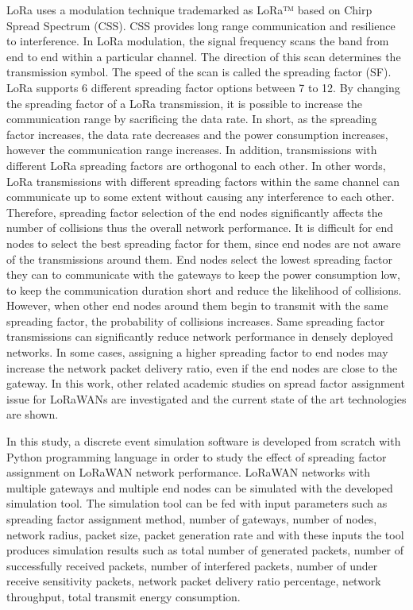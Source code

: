 LoRa uses a modulation technique trademarked as LoRa™ based on Chirp Spread Spectrum (CSS). CSS provides long range communication and resilience to interference. In LoRa modulation, the signal frequency scans the band from end to end within a particular channel. The direction of this scan determines the transmission symbol. The speed of the scan is called the spreading factor (SF). LoRa supports 6 different spreading factor options between 7 to 12. By changing the spreading factor of a LoRa transmission, it is possible to increase the communication range by sacrificing the data rate. In short, as the spreading factor increases, the data rate decreases and the power consumption increases, however the communication range increases. In addition, transmissions with different LoRa spreading factors are orthogonal to each other. In other words, LoRa transmissions with different spreading factors within the same channel can communicate up to some extent without causing any interference to each other. Therefore, spreading factor selection of the end nodes significantly affects the number of collisions thus the overall network performance. It is difficult for end nodes to select the best spreading factor for them, since end nodes are not aware of the transmissions around them. End nodes select the lowest spreading factor they can to communicate with the gateways to keep the power consumption low, to keep the communication duration short and reduce the likelihood of collisions. However, when other end nodes around them begin to transmit with the same spreading factor, the probability of collisions increases. Same spreading factor transmissions can significantly reduce network performance in densely deployed networks. In some cases, assigning a higher spreading factor to end nodes may increase the network packet delivery ratio, even if the end nodes are close to the gateway. In this work, other related academic studies on spread factor assignment issue for LoRaWANs are investigated and the current state of the art technologies are shown.

In this study, a discrete event simulation software is developed from scratch with Python programming language in order to study the effect of spreading factor assignment on LoRaWAN network performance. LoRaWAN networks with multiple gateways and multiple end nodes can be simulated with the developed simulation tool. The simulation tool can be fed with input parameters such as spreading factor assignment method, number of gateways, number of nodes, network radius, packet size, packet generation rate and with these inputs the tool produces simulation results such as total number of generated packets, number of successfully received packets, number of interfered packets, number of under receive sensitivity packets, network packet delivery ratio percentage, network throughput, total transmit energy consumption.

